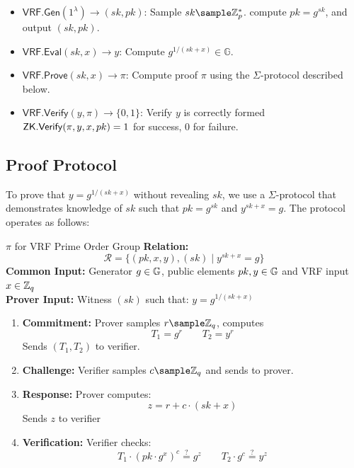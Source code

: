 \begin{itemize}
    \item $\mathsf{VRF.Gen}(1^\lambda) \to (sk, pk)$: Sample $sk \sample \mathbb{Z}_p^*$. compute $pk = g^{sk}$, and output $(sk, pk)$.
    
    \item $\mathsf{VRF.Eval}(sk, x) \to y$: Compute $g^{1/(sk + x)} \in \mathbb{G}$.
    
    \item $\mathsf{VRF.Prove}(sk, x) \to \pi$: Compute proof $\pi$ using the $\Sigma$-protocol described below.
    
    \item $\mathsf{VRF.Verify}(y, \pi) \to \{0, 1\}$: Verify $y$ is correctly formed $\mathsf{ZK.Verify}(\pi, y, x, pk) = 1$ for success, 0 for failure.
\end{itemize}


\subsection{Proof Protocol}
To prove that $y = g^{1/(sk+x)}$ without revealing $sk$, we use a $\Sigma$-protocol that demonstrates knowledge of $sk$ such that $pk = g^{sk}$ and $y^{sk+x} = g$. The protocol operates as follows:

\begin{protocol}{$\pi$ for VRF Prime Order Group}{}\label{pok-vrf-prime-order-group}
\textbf{Relation: }
\[
\mathcal{R} = \{(pk, x, y), (sk) \mid y^{sk+x} = g\}
\]
\textbf{Common Input:} Generator $g \in \mathbb{G}$, public elements $pk, y \in \mathbb{G}$ and VRF input $x \in \mathbb{Z}_q$\\
\textbf{Prover Input:} Witness $(sk)$ such that: $y = g^{1/(sk + x)}$
\begin{enumerate}
    \item \textbf{Commitment:} Prover samples $r \sample \Z_q$, computes 
    \[
    T_1 = g^r \qquad T_2 = y^r
    \]
    Sends $(T_1, T_2)$ to verifier.
    
    \item \textbf{Challenge:} Verifier samples $c \sample \mathbb{Z}_q$ and sends to prover.
    
    \item \textbf{Response:} Prover computes:
    \[
    z = r + c \cdot (sk + x)
    \]
    Sends $z$ to verifier
    
    \item \textbf{Verification:} Verifier checks:
    \[
    T_1 \cdot (pk \cdot g^x)^c \stackrel{?}{=} g^z \qquad T_2 \cdot g^c \stackrel{?}{=} y^z
    \]
 
\end{enumerate}
\end{protocol}

